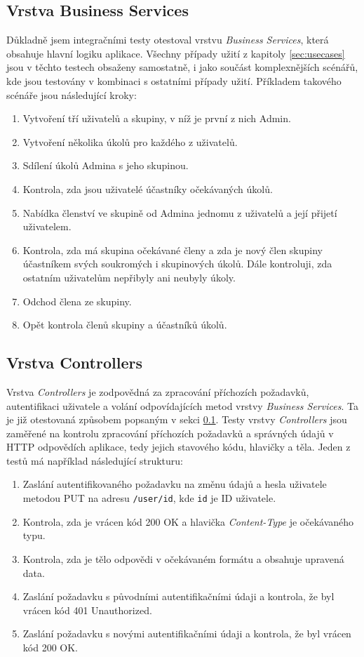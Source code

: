 \documentclass[thesis=B,czech]{FITthesis}[2012/06/26]
\begin{document}
		\subsection{Vrstva Business Services}
			\label{sec:testing-services}
			Důkladně jsem integračními testy otestoval vrstvu \textit{Business Services}, která obsahuje hlavní logiku aplikace. Všechny případy užití z kapitoly \ref{sec:usecases} jsou v těchto testech obsaženy samostatně, i jako součást komplexnějších scénářů, kde jsou testovány v kombinaci s ostatními případy užití. Příkladem takového scénáře jsou následující kroky:
			\begin{enumerate}
				\item Vytvoření tří uživatelů a skupiny, v níž je první z nich Admin.
				\item Vytvoření několika úkolů pro každého z uživatelů.
				\item Sdílení úkolů Admina s jeho skupinou.
				\item Kontrola, zda jsou uživatelé účastníky očekávaných úkolů.
				\item Nabídka členství ve skupině od Admina jednomu z uživatelů a její přijetí uživatelem.
				\item Kontrola, zda má skupina očekávané členy a zda je nový člen skupiny účastníkem svých soukromých i skupinových úkolů. Dále kontroluji, zda ostatním uživatelům nepřibyly ani neubyly úkoly.
				\item Odchod člena ze skupiny.
				\item Opět kontrola členů skupiny a účastníků úkolů.
			\end{enumerate}
		
		\subsection{Vrstva Controllers}
			Vrstva \textit{Controllers} je zodpovědná za zpracování příchozích požadavků, autentifikaci uživatele a volání odpovídajících metod vrstvy \textit{Business Services}. Ta je již otestovaná způsobem popsaným v sekci \ref{sec:testing-services}. Testy vrstvy \textit{Controllers} jsou zaměřené na kontrolu zpracování příchozích požadavků a správných údajů v HTTP odpovědích aplikace, tedy jejich stavového kódu, hlavičky a těla. Jeden z testů má například následující strukturu:
			
			\begin{enumerate}
				\item Zaslání autentifikovaného požadavku na změnu údajů a hesla uživatele metodou PUT na adresu \texttt{/user/id}, kde \texttt{id} je ID uživatele.
				\item Kontrola, zda je vrácen kód 200 OK a hlavička \textit{Content-Type} je očekávaného typu.
				\item Kontrola, zda je tělo odpovědi v očekávaném formátu a obsahuje upravená data.
				\item Zaslání požadavku s původními autentifikačními údaji a kontrola, že byl vrácen kód 401 Unauthorized.
				\item Zaslání požadavku s novými autentifikačními údaji a kontrola, že byl vrácen kód 200 OK.
			\end{enumerate}
						
\end{document}
